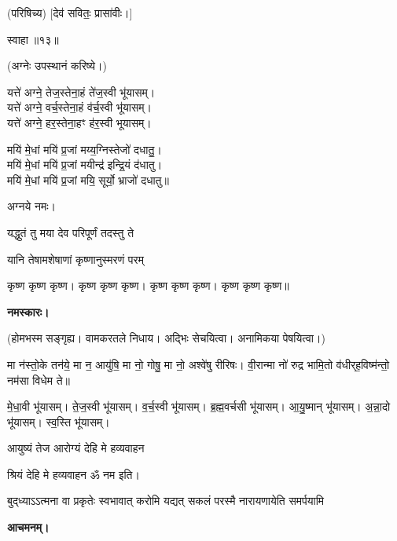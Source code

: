 (परिषिच्य) [देव॑ सवितः॒ प्रासा॑वीः।]

स्वाहा॥१३॥


(अग्नेः उपस्थानं करिष्ये।)

यत्ते॑ अग्ने॒ तेज॒स्तेना॒हं ते॑ज॒स्वी भू॑यासम्।\\
यत्ते॑ अग्ने॒ वर्च॒स्तेना॒हं व॑र्च॒स्वी भू॑यासम्।\\
यत्ते॑ अग्ने॒ हर॒स्तेना॒हꣳ ह॑र॒स्वी भूयासम्।

मयि॑ मे॒धां मयि॑ प्र॒जां मय्य॒ग्निस्तेजो॑ दधातु॒।\\
मयि॑ मे॒धां मयि॑ प्र॒जां मयीन्द्र॑ इन्द्रि॒यं द॑धातु।\\
मयि॑ मे॒धां मयि॑ प्र॒जां मयि॒ सूर्यो॒ भ्राजो॑ दधातु॥
 
अग्नये नमः। 

{यद्धुतं तु मया देव परिपूर्णं तदस्तु ते}

{यानि तेषामशेषाणां कृष्णानुस्मरणं परम्}

कृष्ण कृष्ण कृष्ण। कृष्ण कृष्ण कृष्ण। कृष्ण कृष्ण कृष्ण। कृष्ण कृष्ण कृष्ण॥

\textbf{नमस्कारः।}


(होमभस्म सङ्गृह्य। वामकरतले निधाय। अद्भिः सेचयित्वा। अनामिकया पेषयित्वा।)

 मा न॑स्तो॒के तन॑ये॒ मा न॒ आयु॑षि॒ मा नो॒ गोषु॒ मा नो॒ अश्वे॑षु रीरिषः। वी॒रान्मा नो॑ रुद्र भामि॒तो व॑धीर्‌ह॒विष्म॑न्तो॒ नम॑सा विधेम ते॥
 
 मे॒धा॒वी भू॑यासम्। ते॒ज॒स्वी भू॑यासम्। व॒र्च॒स्वी भू॑यासम्। ब्र॒ह्म॒वर्चसी भू॑यासम्।
 आ॒यु॒ष्मान् भू॑यासम्। अ॒न्ना॒दो भू॑यासम्। स्व॒स्ति भू॑यासम्।
 
{आयुष्यं तेज आरोग्यं देहि मे हव्यवाहन}
 
श्रियं देहि मे हव्यवाहन ॐ नम इति।

{बुद्‌ध्याऽऽत्मना वा प्रकृतेः स्वभावात्}
{करोमि यद्यत् सकलं परस्मै}
{नारायणायेति समर्पयामि}

\textbf{आचमनम्।}
